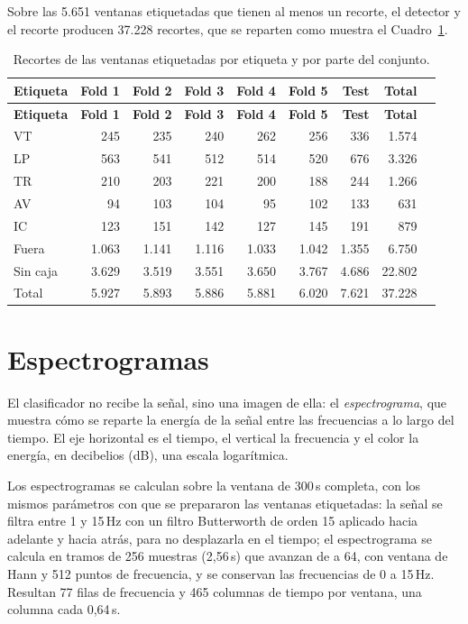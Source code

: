 Sobre las 5.651 ventanas etiquetadas que tienen al menos un recorte, el
detector y el recorte producen 37.228 recortes, que se reparten como muestra
el Cuadro~\ref{tab:recortes-folds}.

{\small
\begin{longtable}{lrrrrrrrr}
\caption{Recortes de las ventanas etiquetadas por etiqueta y por parte del
conjunto.}\label{tab:recortes-folds}\\
\toprule
\textbf{Etiqueta} & \textbf{Fold 1} & \textbf{Fold 2} & \textbf{Fold 3} &
\textbf{Fold 4} & \textbf{Fold 5} & \textbf{Test} & \textbf{Total} \\
\midrule
\endfirsthead
\toprule
\textbf{Etiqueta} & \textbf{Fold 1} & \textbf{Fold 2} & \textbf{Fold 3} &
\textbf{Fold 4} & \textbf{Fold 5} & \textbf{Test} & \textbf{Total} \\
\midrule
\endhead
\bottomrule
\endlastfoot
VT & 245 & 235 & 240 & 262 & 256 & 336 & 1.574 \\
LP & 563 & 541 & 512 & 514 & 520 & 676 & 3.326 \\
TR & 210 & 203 & 221 & 200 & 188 & 244 & 1.266 \\
AV & 94 & 103 & 104 & 95 & 102 & 133 & 631 \\
IC & 123 & 151 & 142 & 127 & 145 & 191 & 879 \\
Fuera & 1.063 & 1.141 & 1.116 & 1.033 & 1.042 & 1.355 & 6.750 \\
Sin caja & 3.629 & 3.519 & 3.551 & 3.650 & 3.767 & 4.686 & 22.802 \\
\midrule
Total & 5.927 & 5.893 & 5.886 & 5.881 & 6.020 & 7.621 & 37.228 \\
\end{longtable}
}

\section{Espectrogramas}
\label{sec:recorte-espectrogramas}

El clasificador no recibe la señal, sino una imagen de ella: el
\emph{espectrograma}, que muestra cómo se reparte la energía de la señal entre
las frecuencias a lo largo del tiempo. El eje horizontal es el tiempo, el
vertical la frecuencia y el color la energía, en decibelios (dB), una escala
logarítmica.

Los espectrogramas se calculan sobre la ventana de 300\,s completa, con los
mismos parámetros con que se prepararon las ventanas etiquetadas: la señal se
filtra entre 1 y 15\,Hz con un filtro Butterworth de orden 15 aplicado hacia
adelante y hacia atrás, para no desplazarla en el tiempo; el espectrograma se
calcula en tramos de 256 muestras (2,56\,s) que avanzan de a 64, con ventana
de Hann y 512 puntos de frecuencia, y se conservan las frecuencias de 0 a
15\,Hz. Resultan 77 filas de frecuencia y 465 columnas de tiempo por ventana,
una columna cada 0,64\,s.

